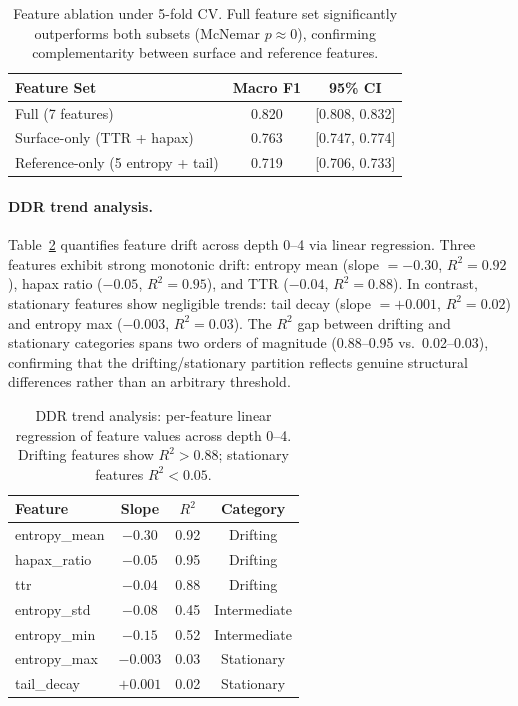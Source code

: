 \documentclass[11pt]{article}
\begin{document}
\begin{table}[t]
\centering
\small
\begin{tabular}{lcc}
\toprule
\textbf{Feature Set} & \textbf{Macro F1} & \textbf{95\% CI} \\
\midrule
Full (7 features) & 0.820 & [0.808, 0.832] \\
Surface-only (TTR + hapax) & 0.763 & [0.747, 0.774] \\
Reference-only (5 entropy + tail) & 0.719 & [0.706, 0.733] \\
\bottomrule
\end{tabular}
\caption{Feature ablation under 5-fold CV. Full feature set significantly outperforms both subsets (McNemar $p \approx 0$), confirming complementarity between surface and reference features.}
\label{tab:ablation}
\end{table}

\paragraph{DDR trend analysis.}
Table~\ref{tab:ddr_trend} quantifies feature drift across depth 0--4 via linear regression. Three features exhibit strong monotonic drift: entropy mean (slope $= -0.30$, $R^2 = 0.92$), hapax ratio ($-0.05$, $R^2 = 0.95$), and TTR ($-0.04$, $R^2 = 0.88$). In contrast, stationary features show negligible trends: tail decay (slope $= +0.001$, $R^2 = 0.02$) and entropy max ($-0.003$, $R^2 = 0.03$). The $R^2$ gap between drifting and stationary categories spans two orders of magnitude (0.88--0.95 vs.\ 0.02--0.03), confirming that the drifting/stationary partition reflects genuine structural differences rather than an arbitrary threshold.

\begin{table}[t]
\centering
\small
\begin{tabular}{lccc}
\toprule
\textbf{Feature} & \textbf{Slope} & \textbf{$R^2$} & \textbf{Category} \\
\midrule
entropy\_mean & $-0.30$ & 0.92 & Drifting \\
hapax\_ratio & $-0.05$ & 0.95 & Drifting \\
ttr & $-0.04$ & 0.88 & Drifting \\
entropy\_std & $-0.08$ & 0.45 & Intermediate \\
entropy\_min & $-0.15$ & 0.52 & Intermediate \\
\midrule
entropy\_max & $-0.003$ & 0.03 & Stationary \\
tail\_decay & $+0.001$ & 0.02 & Stationary \\
\bottomrule
\end{tabular}
\caption{DDR trend analysis: per-feature linear regression of feature values across depth 0--4. Drifting features show $R^2 > 0.88$; stationary features $R^2 < 0.05$.}
\label{tab:ddr_trend}
\end{table}
\end{document}
